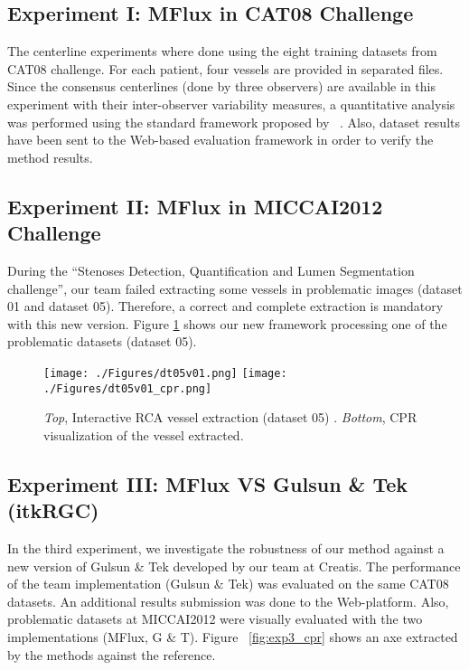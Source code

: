 \subsection{Experiment I: MFlux in CAT08 Challenge}

The centerline experiments where done using the eight training datasets from CAT08 challenge. For each patient, four vessels are provided in separated files. Since the consensus centerlines (done by three observers) are available in this experiment with their inter-observer variability measures, a quantitative analysis was performed using the standard framework proposed by ~\citep{Schaap2009}. Also, dataset results have been sent to the Web-based evaluation framework in order to verify the method results.

\subsection{Experiment II: MFlux in MICCAI2012 Challenge}

During the ``Stenoses Detection, Quantification and Lumen Segmentation challenge'', our team failed extracting some  vessels in problematic images (dataset 01 and dataset 05). Therefore, a correct and complete extraction is mandatory with this new version. Figure \ref{fig:exp2_dt05} shows our new framework processing one of the problematic datasets (dataset 05).

\begin{figure}[htbp]
	\centering
		\texttt{[image: ./Figures/dt05v01.png]}
		\texttt{[image: ./Figures/dt05v01\_cpr.png]}
	\caption[MICCAI2012 Extraction]{\textit{Top}, Interactive RCA vessel extraction (dataset 05) . \textit{Bottom}, CPR visualization of the vessel extracted.}
	\label{fig:exp2_dt05}
\end{figure}

\subsection{Experiment III: MFlux VS Gulsun \& Tek (itkRGC)}

In the third experiment, we investigate the robustness of our method against a new version of Gulsun \& Tek developed by our team at Creatis. The performance of the team implementation (Gulsun \& Tek) was evaluated on the same CAT08 datasets. An additional results submission was done to the Web-platform. Also, problematic datasets at MICCAI2012 were visually evaluated with the two implementations (MFlux, G \& T). Figure ~\ref{fig:exp3_cpr} shows an axe extracted by the methods against the reference.

